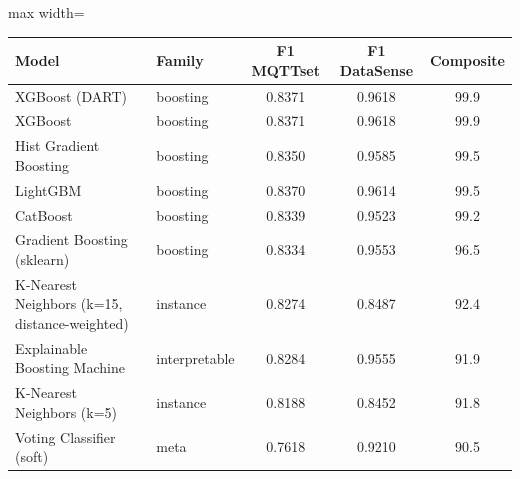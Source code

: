 \begin{adjustbox}{max width=\linewidth}
\begin{tabular}{llccc}
\toprule
Model & Family & F1 MQTTset & F1 DataSense & Composite \\
\midrule
XGBoost (DART) & boosting & 0.8371 & 0.9618 & 99.9 \\
XGBoost & boosting & 0.8371 & 0.9618 & 99.9 \\
Hist Gradient Boosting & boosting & 0.8350 & 0.9585 & 99.5 \\
LightGBM & boosting & 0.8370 & 0.9614 & 99.5 \\
CatBoost & boosting & 0.8339 & 0.9523 & 99.2 \\
Gradient Boosting (sklearn) & boosting & 0.8334 & 0.9553 & 96.5 \\
K-Nearest Neighbors (k=15, distance-weighted) & instance & 0.8274 & 0.8487 & 92.4 \\
Explainable Boosting Machine & interpretable & 0.8284 & 0.9555 & 91.9 \\
K-Nearest Neighbors (k=5) & instance & 0.8188 & 0.8452 & 91.8 \\
Voting Classifier (soft) & meta & 0.7618 & 0.9210 & 90.5 \\
\bottomrule
\end{tabular}
\end{adjustbox}
